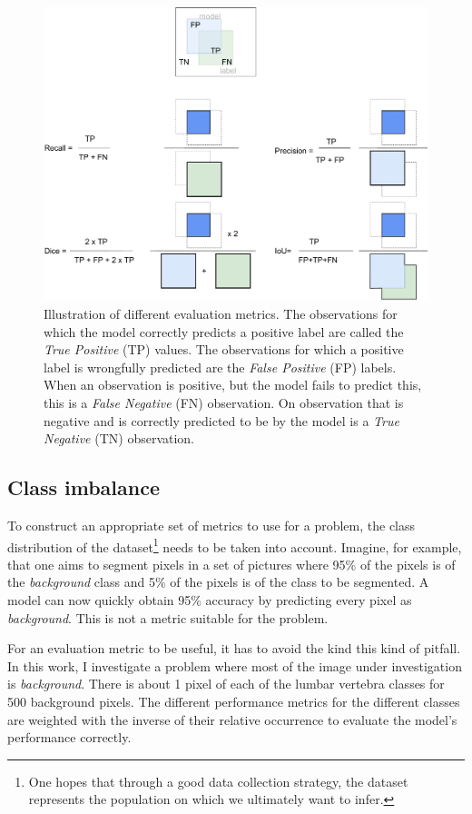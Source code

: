 \begin{figure}
    \centering
    \includegraphics[width=.95\textwidth]{images/Metrics.pdf}
    \caption{Illustration of different evaluation metrics. 
    The observations for which the model correctly predicts a positive label are called the \textit{True Positive} (TP) values.
    The observations for which a positive label is wrongfully predicted are the \textit{False Positive} (FP) labels. 
    When an observation is positive, but the model fails to predict this, this is a \textit{False Negative} (FN) observation.
    On observation that is negative and is correctly predicted to be by the model is a \textit{True Negative} (TN) observation.
    }
\end{figure}

\subsection{Class imbalance\label{sec:class_imbalance}}
\par{
    To construct an appropriate set of metrics to use for a problem, the class distribution of the dataset\footnote{
        One hopes that through a good data collection strategy, the dataset represents the population on which we ultimately want to infer.
        } needs to be taken into account.
    Imagine, for example, that one aims to segment pixels in a set of pictures where 95\% of the pixels is of the \textit{background} class and 5\% of the pixels is of the class to be segmented.
    A model can now quickly obtain 95\% accuracy by predicting every pixel as \textit{background}. This is not a metric suitable for the problem.
}
\par{
    For an evaluation metric to be useful, it has to avoid the kind this kind of pitfall.
    In this work, I investigate a problem where most of the image under investigation is \textit{background}. 
    There is about 1 pixel of each of the lumbar vertebra classes for 500 background pixels.
    The different performance metrics for the different classes are weighted with the inverse of their relative occurrence to evaluate the model's performance correctly.
}
\newpage
